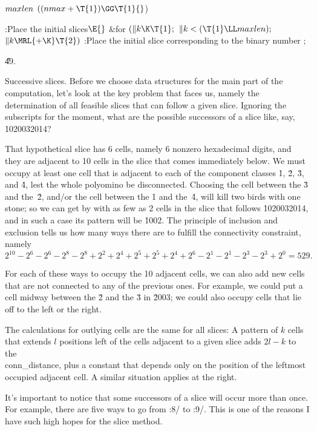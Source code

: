 \Y\B\4\D$\\{maxlen}$ \5
$((\\{nmax}+\T{1})\GG\T{1}{}$)%
\par
\Y\B\4:Place the initial slices\X${}\E{}$\6
\&{for} ${}(\|k\K\T{1};{}$ ${}\|k<(\T{1}\LL\\{maxlen});{}$ ${}\|k\MRL{+{\K}}%
\T{2}){}$\1\5
:Place the initial slice corresponding to the binary number \X;\2%
\par
\U49.\fi

Successive slices. Before we choose data structures for
the main part of the
computation, let's look at the key problem that faces us, namely the
determination of all feasible slices that can follow a given slice.
Ignoring the subscripts for the moment, what are the possible successors of a
slice like, say, \.{1020032014}?

That hypothetical slice has 6 cells, namely 6 nonzero hexadecimal digits,
and they are adjacent to 10 cells in the slice that
comes immediately below. We must occupy at least one cell that is adjacent
to each of the component classes \.1, \.2, \.3, and \.4, lest the whole
polyomino be disconnected. Choosing the cell between the \.3 and the~\.2,
and/or the cell between the \.1 and the~\.4,
will kill two birds with one stone; so
we can get by with as few as 2 cells in the slice that follows \.{1020032014},
and in such a case its pattern will be \.{1002}.
The principle of inclusion and exclusion tells us how many ways there are to
fulfill the connectivity constraint, namely
$$2^{10}-2^6-2^6-2^8-2^8+2^2+2^4+2^5+2^5+2^4+2^6-2^1-2^1-2^3-2^3+2^0=529.$$

For each of these ways to occupy the 10 adjacent cells, we can also add
new cells that are not connected to any of the previous ones. For example,
we could put a cell midway between the \.2 and the \.3 in \.{2003};
we could also occupy cells that lie off to the left or the right.

The calculations for outlying cells are the same for all slices: A pattern
of $k$ cells that extends $l$ positions left of the cells adjacent to a given
slice adds $2l-k$ to the \\{conn\_distance}, plus a constant that depends only
on the position of the leftmost occupied adjacent cell.
A similar situation applies at the right.

It's important to notice that some successors of a slice will occur
more than once. For example, there are five ways to go from :8/ to
:9/. This is one of the reasons I have such high hopes for the slice
method.


